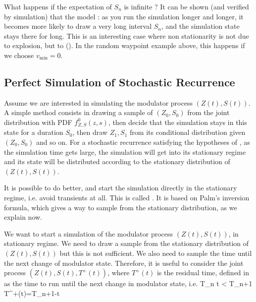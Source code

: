 What happens if the expectation of $S_n$ is infinite ? It can be
shown (and verified by simulation) that the model : as
you run the simulation longer and longer, it becomes more likely to
draw a very long interval $S_n$, and the simulation state stays
there for long. This is an interesting case where non stationarity
is not due to explosion, but to  ().
In the random waypoint example above, this happens if we choose
$v_{\min}=0$.

\subsection{Perfect Simulation of Stochastic Recurrence}
\label{sec-perfect} Assume we are interested in simulating the
modulator process $(Z(t), S(t))$. A simple method consists in
drawing a sample of $(Z_0,S_0)$ from the joint distribution
with PDF $f^0_{Z,S}(z,s)$, then decide that the simulation
stays in this state for a duration $S_0$, then draw $Z_1, S_1$
from its conditional distribution given $(Z_0,S_0)$ and so on.
For a stochastic recurrence satisfying the hypotheses of
, as the simulation time gets large,
the simulation will get into its stationary regime and its
state will be distributed according to the stationary
distribution of $(Z(t),S(t))$.

It is possible to do better, and start the simulation directly in
the stationary regime, i.e. avoid transients at all. This is called
. It is based on Palm's inversion formula,
which gives a way to sample from the stationary distribution, as we
explain now.

We want to start a simulation of the modulator process $(Z(t),
S(t))$, in stationary regime. We need to draw a sample from the
stationary distribution of  $(Z(t), S(t))$ but this is not
sufficient. We also need to sample the time until the next change of
modulator state. Therefore, it is useful to consider the joint
process $(Z(t), S(t), T^+(t))$, where $T^+(t)$ is the residual time,
defined in  as the time to run until the next
change in modulator state, i.e.
 \ben
 \mif T_n \leq t < T_{n+1} \mthen T^+(t)=T_{n+1}-t
 \een

